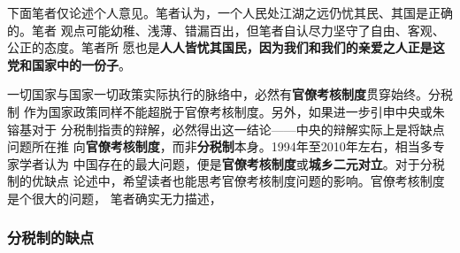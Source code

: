 下面笔者仅论述个人意见。笔者认为，一个人民处江湖之远仍忧其民、其国是正确的。笔者
观点可能幼稚、浅薄、错漏百出，但笔者自认尽力坚守了自由、客观、公正的态度。笔者所
愿也是\textbf{人人皆忧其国民，因为我们和我们的亲爱之人正是这党和国家中的一份子}。

一切国家与国家一切政策实际执行的脉络中，必然有\textbf{官僚考核制度}贯穿始终。分税制
作为国家政策同样不能超脱于官僚考核制度。另外，如果进一步引申中央或朱镕基对于
分税制指责的辩解，必然得出这一结论——中央的辩解实际上是将缺点问题所在推
向\textbf{官僚考核制度}，而非\textbf{分税制}本身。1994年至2010年左右，相当多专家学者认为
中国存在的最大问题，便是\textbf{官僚考核制度}或\textbf{城乡二元对立}。对于分税制的优缺点
论述中，希望读者也能思考官僚考核制度问题的影响。官僚考核制度是个很大的问题，
笔者确实无力描述，


\subsubsection{分税制的缺点}


